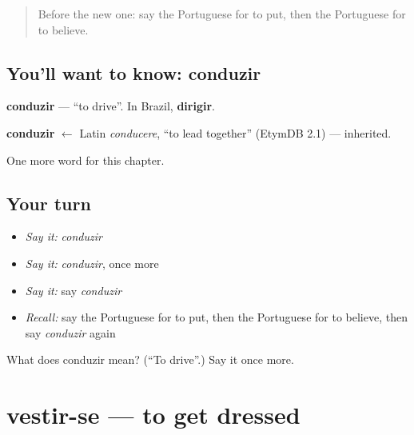 \label{lesson:PT-C131-conduzir}



\begin{quote}
Before the new one: say the Portuguese for to put, then the Portuguese for to believe.
\end{quote}

\subsection*{You'll want to know: conduzir}
\textbf{conduzir} — \textquotedblleft{}to drive\textquotedblright{}. In Brazil, \textbf{dirigir}.

\begin{cousinweb}
\textbf{conduzir} $\leftarrow$ Latin \emph{conducere}, \textquotedblleft{}to lead together\textquotedblright{} (EtymDB 2.1) — inherited.
\end{cousinweb}

\begin{grammarlens}[title={What you've built}]
One more word for this chapter.
\end{grammarlens}

\subsection*{Your turn}
\begin{itemize}
\raggedright
  \item \emph{Say it:} \emph{conduzir}
  \item \emph{Say it:} \emph{conduzir}, once more
  \item \emph{Say it:} say \emph{conduzir}
  \item \emph{Recall:} say the Portuguese for to put, then the Portuguese for to believe, then say \emph{conduzir} again
\end{itemize}

\begin{tcolorbox}[breakable,colback=teal!4,colframe=teal!35!black,title={Before you move on}]
What does conduzir mean? (\textquotedblleft{}To drive\textquotedblright{}.) Say it once more.
\end{tcolorbox}
\section[vestir-se]{vestir-se — to get dressed}

\label{lesson:PT-C131-vestir-se}



